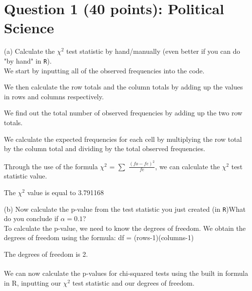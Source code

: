 \documentclass[12pt,letterpaper]{article}
\begin{document}
	\section*{Question 1 (40 points): Political Science}
\vspace{.25cm}
(a)
Calculate the $\chi^2$ test statistic by hand/manually (even better if you can do "by hand" in \texttt{R}).\\

We start by inputting all of the observed frequencies into the code.

 

We then calculate the row totals and the column totals by adding up the values in rows and columns respectively.

 

We find out the total number of observed frequencies by adding up the two row totals.

 

We calculate the expected frequencies for each cell by multiplying the row total by the column total and dividing by the total observed frequencies.

 

Through the use of the formula $\chi^2$ = $\sum$ \(\frac{(fo-fe)^2}{fe}\), we can calculate the $\chi^2$ test statistic value. 

 

The $\chi^2$ value is equal to 3.791168

\newpage
(b)
Now calculate the p-value from the test statistic you just created (in \texttt{R})What do you conclude if $\alpha = 0.1$?
\\

To calculate the p-value, we need to know the degrees of freedom. We obtain the degrees of freedom using the formula: df = (rows-1)(columns-1)

 

The degrees of freedom is 2.
\\\\
We can now calculate the p-values for chi-squared tests using the built in formula in R, inputting our $\chi^2$ test statistic and our degrees of freedom.
\end{document}
